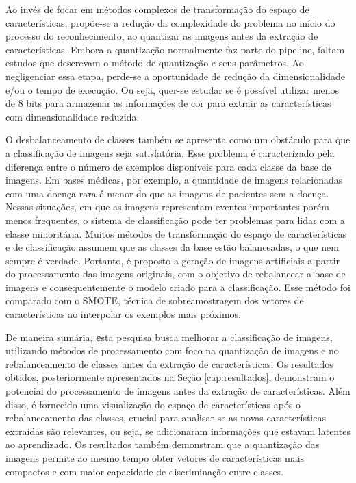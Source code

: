 Ao invés de focar em métodos complexos de transformação do espaço de características, propõe-se a redução da complexidade do problema no início do processo do reconhecimento, ao quantizar as imagens antes da extração de características. Embora a quantização normalmente faz parte do pipeline, faltam estudos que descrevam o método de quantização e seus parâmetros. Ao negligenciar essa etapa, perde-se a oportunidade de redução da dimensionalidade e/ou o tempo de execução. Ou seja, quer-se estudar se é possível utilizar menos de 8 bits para armazenar as informações de cor para extrair as características com dimensionalidade reduzida.

O desbalanceamento de classes também se apresenta como um obstáculo para que a classificação de imagens seja satisfatória. Esse problema é caracterizado pela diferença entre o número de exemplos disponíveis para cada classe da base de imagens. Em bases médicas, por exemplo, a quantidade de imagens relacionadas com uma doença rara é menor do que as imagens de pacientes sem a doença. Nessas situações, em que as imagens representam eventos importantes porém menos frequentes, o sistema de classificação pode ter problemas para lidar com a classe minoritária. Muitos métodos de transformação do espaço de características e de classificação assumem que as classes da base estão balanceadas, o que nem sempre é verdade. Portanto, é proposto a geração de imagens artificiais a partir do processamento das imagens originais, com o objetivo de rebalancear a base de imagens e consequentemente o modelo criado para a classificação. Esse método foi comparado com o SMOTE, técnica de sobreamostragem dos vetores de características ao interpolar os exemplos mais próximos.

De maneira sumária, {\textbf esta pesquisa busca melhorar a classificação de imagens, utilizando métodos de processamento com foco na quantização de imagens e no rebalanceamento de classes antes da extração de características.} Os resultados obtidos, posteriormente apresentados na Seção \ref{cap:resultados}, demonstram o potencial do processamento de imagens antes da extração de características. Além disso, é fornecido uma visualização do espaço de características após o rebalanceamento das classes, crucial para analisar se as novas características extraídas são relevantes, ou seja, se adicionaram informações que estavam latentes ao aprendizado. Os resultados também demonstram que a quantização das imagens permite ao mesmo tempo obter vetores de características mais compactos e com maior capacidade de discriminação entre classes.

